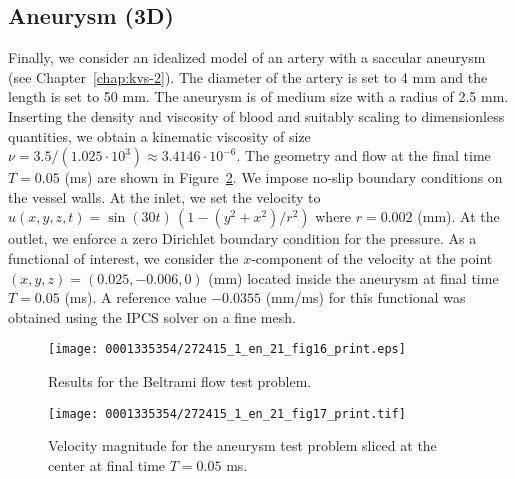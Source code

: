 \vspace*{3pt}
\subsection{Aneurysm (3D)}

Finally, we consider an idealized model of an artery with a saccular
aneurysm (see Chapter~\ref{chap:kvs-2}). The diameter of the artery is
set to 4 mm and the length is set to 50 mm. The aneurysm is of medium
size with a radius of 2.5 mm. Inserting the density and viscosity of
blood and suitably scaling to dimensionless quantities, we obtain a
kinematic viscosity of size $\nu = 3.5 / (1.025 \cdot 10^3) \approx
3.4146 \cdot 10^{-6}$. The geometry and flow at the final time $T =
0.05$ (ms) are shown in Figure~\ref{fig:aneurysm}. We impose no-slip
boundary conditions on the vessel walls. At the inlet, we set the
velocity to $u(x, y, z, t) = \sin(30 t) \, (1 - (y^2 + x^2) / r^2)$
where $r = 0.002$ (mm). At the outlet, we enforce a zero Dirichlet
boundary condition for the pressure. As a functional of interest, we
consider the $x$-component of the velocity at the point $(x, y, z) =
(0.025, -0.006, 0)$ (mm) located inside the aneurysm at final time $T
= 0.05$ (ms). A reference value $-0.0355$ (mm/ms) for this functional
was obtained using the IPCS solver on a fine mesh.

\makeatletter
\def\img@cmode{\hskip-5pt\begin{turn}{90}\rlap{\kern85\p@\@img@cmode{\@cmodetext}}\end{turn}}
\makeatother

\begin{figure}[!t]
\centering
\texttt{[image: 0001335354/272415\_1\_en\_21\_fig16\_print.eps]}
\caption{Results for the Beltrami flow test problem.}
\label{fig:beltrami_res}\vspace*{10pt}
\end{figure}

\makeatletter
\def\img@cmode{\hskip-5pt\begin{turn}{90}\rlap{\kern1.5\p@\@img@cmode{\@cmodetext}}\end{turn}}
\makeatother

\begin{figure}[!t]
\centering
\texttt{[image: 0001335354/272415\_1\_en\_21\_fig17\_print.tif]}
\caption{Velocity magnitude for the aneurysm test problem sliced at
the center at final time $T = 0.05$ ms.}
\label{fig:aneurysm}
\end{figure}

